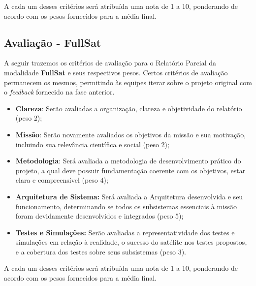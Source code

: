         A cada um desses critérios será atribuída uma nota de 1 a 10, ponderando de acordo com os pesos fornecidos para a média final.

    \subsection{Avaliação - FullSat}
        A seguir trazemos os critérios de avaliação para o Relatório Parcial da modalidade \textbf{FullSat} e seus respectivos pesos. Certos critérios de avaliação permanecem os mesmos, permitindo às equipes iterar sobre o projeto original com o \textit{feedback} fornecido na fase anterior.
        
        \begin{itemize}
            \item \textbf{Clareza}: Serão avaliadas a organização, clareza e objetividade do relatório (peso 2);
                     
            \item \textbf{Missão}: Serão novamente avaliados os objetivos da missão e sua motivação, incluindo sua relevância científica e social (peso 2);
            
            \item \textbf{Metodologia}: Será avaliada a metodologia de desenvolvimento prático do projeto, a qual deve possuir fundamentação coerente com os objetivos, estar clara e compreensível (peso 4);

            \item \textbf{Arquitetura de Sistema:} Será avaliada a Arquitetura desenvolvida e seu funcionamento, determinando se todos os subsistemas essenciais à missão foram devidamente desenvolvidos e integrados (peso 5);

            \item \textbf{Testes e Simulações:} Serão avaliadas a representatividade dos testes e simulações em relação à realidade, o sucesso do satélite nos testes propostos, e a cobertura dos testes sobre seus subsistemas (peso 3).
        \end{itemize}
        
        A cada um desses critérios será atribuída uma nota de 1 a 10, ponderando de acordo com os pesos fornecidos para a média final.
